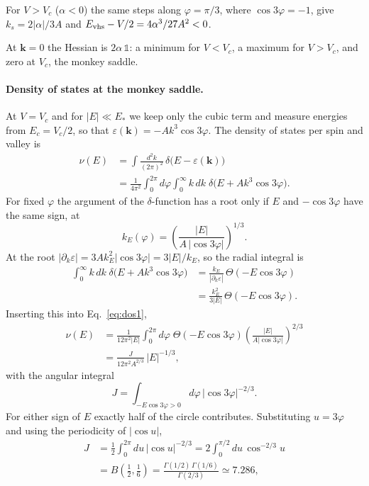 \documentclass[aps,prb,twocolumn,superscriptaddress,floatfix,nofootinbib]{revtex4-2}
\newcommand{\bk}{\mathbf{k}}
\newcommand{\Evhs}{E_{\rm vhs}}
\begin{document}
For $V>V_c$ ($\alpha<0$) the same steps along $\varphi=\pi/3$, where $\cos3\varphi=-1$, give $k_s=2|\alpha|/3A$ and $\Evhs-V/2=4\alpha^3/27A^2<0$.

At $\bk=0$ the Hessian is $2\alpha\,\mathbb 1$: a minimum for $V<V_c$, a maximum for $V>V_c$, and zero at $V_c$, the monkey saddle.

\paragraph{Density of states at the monkey saddle.}
At $V=V_c$ and for $|E|\ll E_*$ we keep only the cubic term and measure energies from $E_c=V_c/2$, so that $\varepsilon(\bk)=-Ak^3\cos3\varphi$. The density of states per spin and valley is
\begin{align}
\nu(E)&=\int\!\frac{d^2k}{(2\pi)^2}\,\delta\big(E-\varepsilon(\bk)\big)\nonumber\\
&=\frac{1}{4\pi^2}\int_0^{2\pi}\!d\varphi\int_0^\infty\!k\,dk\;\delta\big(E+Ak^3\cos3\varphi\big).
\label{eq:dos1}
\end{align}
For fixed $\varphi$ the argument of the $\delta$-function has a root only if $E$ and $-\cos3\varphi$ have the same sign, at
\begin{equation}
k_E(\varphi)=\left(\frac{|E|}{A\,|\cos3\varphi|}\right)^{1/3}.
\end{equation}
At the root $|\partial_k\varepsilon|=3Ak_E^2|\cos3\varphi|=3|E|/k_E$, so the radial integral is
\begin{align}
\int_0^\infty\!k\,dk\;\delta\big(E+Ak^3\cos3\varphi\big)&=\frac{k_E}{|\partial_k\varepsilon|}\,\Theta(-E\cos3\varphi)\nonumber\\
&=\frac{k_E^2}{3|E|}\,\Theta(-E\cos3\varphi).
\end{align}
Inserting this into Eq.~\eqref{eq:dos1},
\begin{align}
\nu(E)&=\frac{1}{12\pi^2|E|}\int_0^{2\pi}\!d\varphi\;\Theta(-E\cos3\varphi)\left(\frac{|E|}{A|\cos3\varphi|}\right)^{2/3}\nonumber\\
&=\frac{J}{12\pi^2A^{2/3}}\,|E|^{-1/3},
\end{align}
with the angular integral
\begin{equation}
J=\int_{-E\cos3\varphi>0}\!d\varphi\,|\cos3\varphi|^{-2/3}.
\end{equation}
For either sign of $E$ exactly half of the circle contributes. Substituting $u=3\varphi$ and using the periodicity of $|\cos u|$,
\begin{align}
J&=\frac12\int_0^{2\pi}\!du\,|\cos u|^{-2/3}=2\int_0^{\pi/2}\!du\,\cos^{-2/3}u\nonumber\\
&=B\!\left(\tfrac12,\tfrac16\right)=\frac{\Gamma(1/2)\,\Gamma(1/6)}{\Gamma(2/3)}\simeq7.286 ,
\end{align}
\end{document}
